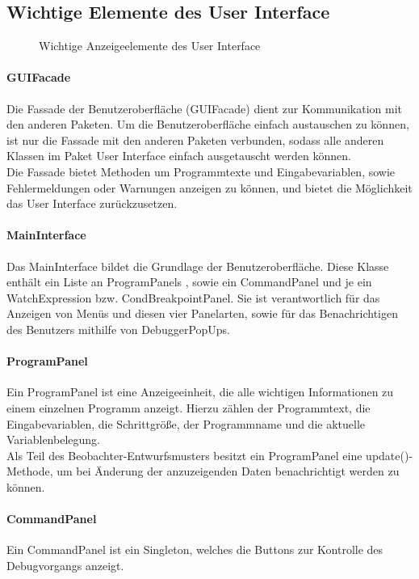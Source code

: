 \documentclass[parskip=full]{scrartcl}
\begin{document}
\subsection{Wichtige Elemente des User Interface}
\begin{figure}[!h]
\centering
\caption{Wichtige Anzeigeelemente des User Interface}
\label{GUIOverview}
\end{figure}
\paragraph{GUIFacade}
Die Fassade der Benutzeroberfläche (GUIFacade) dient zur Kommunikation mit den anderen Paketen. Um die Benutzeroberfläche einfach austauschen zu können, ist nur die Fassade mit den anderen Paketen verbunden, sodass alle anderen Klassen im Paket User Interface einfach ausgetauscht werden können. \\
Die Fassade bietet Methoden um Programmtexte und Eingabevariablen, sowie Fehlermeldungen oder Warnungen anzeigen zu können, und bietet die Möglichkeit
das User Interface zurückzusetzen.
\paragraph{MainInterface}
 Das MainInterface bildet die Grundlage der Benutzeroberfläche. Diese Klasse enthält ein Liste an ProgramPanels , sowie ein CommandPanel und je ein WatchExpression bzw. CondBreakpointPanel. Sie ist verantwortlich für das Anzeigen von Menüs und diesen vier Panelarten, sowie für das Benachrichtigen des Benutzers mithilfe von DebuggerPopUps.
\paragraph{ProgramPanel}
Ein ProgramPanel ist eine Anzeigeeinheit, die alle wichtigen Informationen zu einem einzelnen Programm anzeigt. Hierzu zählen der Programmtext, die Eingabevariablen, die Schrittgröße, der Programmname und die aktuelle Variablenbelegung. \\
Als Teil des Beobachter-Entwurfsmusters besitzt ein ProgramPanel eine update()-Methode, um bei Änderung der anzuzeigenden Daten benachrichtigt werden zu können.
\paragraph{CommandPanel}
Ein CommandPanel ist ein Singleton, welches die Buttons zur Kontrolle des Debugvorgangs anzeigt. 
\end{document}
